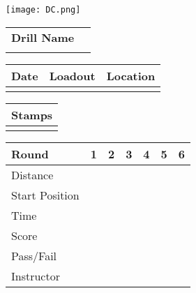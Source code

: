 \documentclass[../Cover.tex]{subfiles}
\begin{document}
	\begin{minipage}[t][0.15\textheight][t]{0.15\textwidth} 
		\texttt{[image: DC.png]}
	\end{minipage}
	\hfill
	\begin{minipage}[t][0.15\textheight][t]{0.8\textwidth}
		\begin{tabular}{ p{} l  }			
			\textbf{Drill Name} \\
			\\[0.09\textheight]
			\hline
		\end{tabular}
		\quad
		\begin{tabular}{ | p{} | p{} | p{} |}
			\hline
			Date & Loadout & Location\\ 
			\hline
			&  &  \\ 
			\hline
		\end{tabular}
	\end{minipage}
	
	\begin{tabular}{p{}|}
		Stamps \\
		\hline
		\\[0.65\textheight]
	\end{tabular}
	\quad
	\begin{tabular}{ | p{} | p{} | p{} | p{} | p{} | p{} | p{} |}
		\hline
		Round & 1 & 2 & 3 & 4 & 5 & 6 \\
		\hline
		\tiny Distance & & & & & & \\[0.05\textheight]
		\hline
		\tiny Start Position & & & & & & \\[0.05\textheight]
		\hline
		\tiny Time & & & & & & \\[0.05\textheight]
		\hline
		\tiny Score & & & & & & \\[0.05\textheight]
		\hline
		\tiny Pass/Fail & & & & & & \\[0.05\textheight]
		\hline
		\tiny Instructor & & & & & & \\[0.05\textheight]
		\hline
	\end{tabular}
\end{document}
